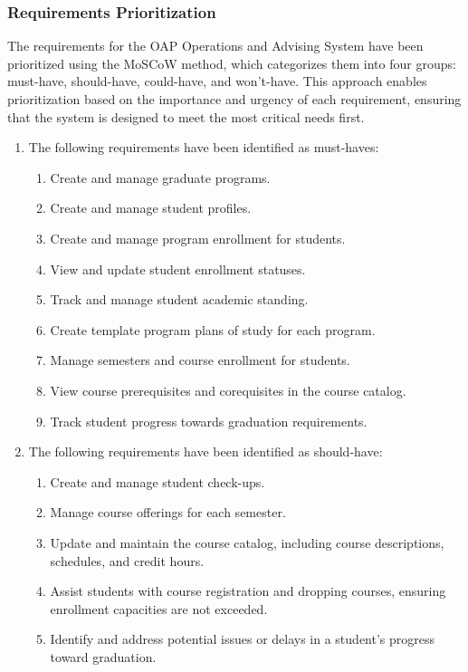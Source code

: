 \documentclass[12pt]{article}
\begin{document}
\subsubsection{Requirements Prioritization}
The requirements for the OAP Operations and Advising System have been prioritized using the MoSCoW method, which categorizes them into four groups: must-have, should-have, could-have, and won't-have. This approach enables prioritization based on the importance and urgency of each requirement, ensuring that the system is designed to meet the most critical needs first.

\begin{enumerate}[label=(\roman*)]
    \item The following requirements have been identified as must-haves:
    \begin{enumerate}
        \item Create and manage graduate programs.
        \item Create and manage student profiles.
        \item Create and manage program enrollment for students.
        \item View and update student enrollment statuses.
        \item Track and manage student academic standing.
        \item Create template program plans of study for each program.
        \item Manage semesters and course enrollment for students.
        \item View course prerequisites and corequisites in the course catalog.
        \item Track student progress towards graduation requirements.
    \end{enumerate}

    \item The following requirements have been identified as should-have:
    \begin{enumerate}
        \item Create and manage student check-ups.
        \item Manage course offerings for each semester.
        \item Update and maintain the course catalog, including course descriptions, schedules, and credit hours.
        \item Assist students with course registration and dropping courses, ensuring enrollment capacities are not exceeded.
        \item Identify and address potential issues or delays in a student's progress toward graduation.
    \end{enumerate}


\end{enumerate}
\end{document}
